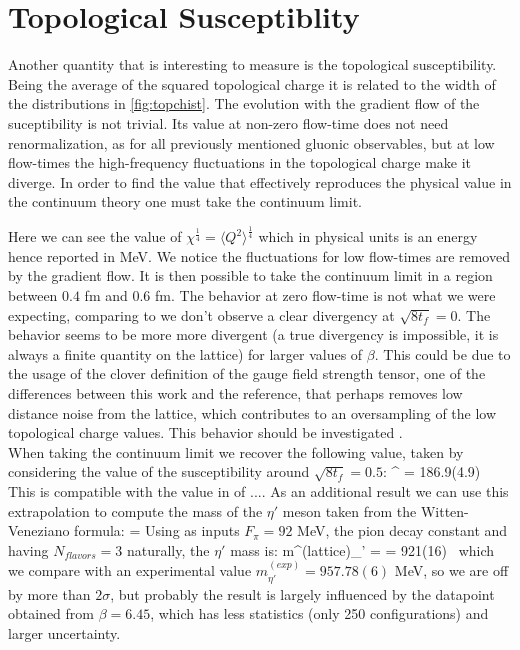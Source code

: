 \section{Topological Susceptiblity}
Another quantity that is interesting to measure is the topological susceptibility. Being the average of the squared topological charge it is related to the width of the distributions in \cref{fig:topchist}. The evolution with the gradient flow of the suceptibility is not trivial. Its value at non-zero flow-time does not need renormalization, as for all previously mentioned gluonic observables, but at low flow-times the high-frequency fluctuations in the topological charge make it diverge. In order to find the value that effectively reproduces the physical value in the continuum theory one must take the continuum limit. 

Here we can see the value of $\chi^{\frac{1}{4}} = \langle Q^2 \rangle ^{\frac{1}{4}}$ which in physical units is an energy hence reported in MeV. We notice the fluctuations for low flow-times are removed by the gradient flow. It is then possible to take the continuum limit in a region between $0.4$ fm and $0.6$ fm. 
The behavior at zero flow-time is not what we were expecting, comparing to \CIT we don't observe a clear divergency at $\sqrt{8t_f} = 0$. The behavior seems to be more more divergent (a true divergency is impossible, it is always a finite quantity on the lattice) for larger values of $\beta$. This could be due to the usage of the clover definition of the gauge field strength tensor, one of the differences between this work and the reference, that perhaps removes low distance noise from the lattice, which contributes to an oversampling of the low topological charge values. This behavior should be investigated .\\
When taking the continuum limit we recover the following value, taken by considering the value of the susceptibility around $\sqrt{8t_f} = 0.5$:
\beq
    \chi^{} = 186.9(4.9)~ 
    \label{val:tops}
\eeq 
This is compatible with the value in \CIT of .... 
As an additional result we can use this extrapolation to compute the mass of the $\eta'$ meson taken from the Witten-Veneziano formula:
\beq
    \chi = 
\eeq 
Using as inputs $F_\pi = 92$ MeV, the pion decay constant and having $N_{flavors} = 3$ naturally, the $\eta'$ mass is:
\beq    
    m^{(lattice)}_{\eta'} =  = 921(16)~ 
\eeq
which we compare with an experimental value  $m^{(exp)}_{\eta'} = 957.78(6)$ MeV, so we are off by more than $2\sigma$, but probably the result is largely influenced by the datapoint obtained from $\beta=6.45$, which has less statistics (only 250 configurations) and larger uncertainty.
